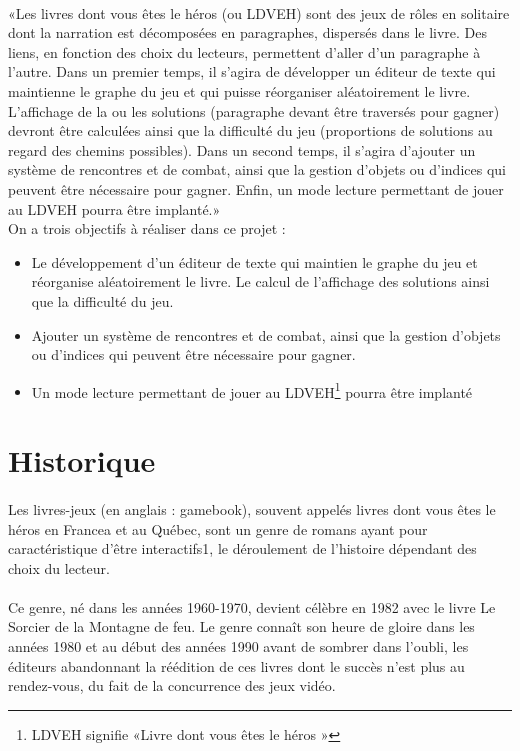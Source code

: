 \documentclass[12pt,a4paper]{article}
\begin{document}
\paragraph{}«Les livres dont vous êtes le héros (ou LDVEH) sont des jeux de rôles en solitaire dont la narration est décomposées en paragraphes, dispersés dans le livre. Des liens, en fonction des choix du lecteurs, permettent d’aller d’un paragraphe à l’autre. Dans un premier temps, il s’agira de développer un éditeur de texte qui maintienne le graphe du jeu et qui puisse réorganiser aléatoirement le livre. L’affichage de la ou les solutions (paragraphe devant être traversés pour gagner) devront être calculées ainsi que la difficulté du jeu (proportions de solutions au regard des chemins possibles). Dans un second temps, il s’agira d’ajouter un système de rencontres et de combat, ainsi que la gestion d’objets ou d’indices qui peuvent être nécessaire pour gagner. Enfin, un mode lecture permettant de jouer au LDVEH pourra être implanté.» \\
On a trois objectifs à réaliser dans ce projet :\\

\begin{itemize}
	\item Le développement d'un éditeur de texte qui maintien le graphe du jeu et réorganise aléatoirement le livre. Le calcul de l'affichage des solutions ainsi que la difficulté du jeu.
	\item Ajouter un système de rencontres et de combat, ainsi que la gestion d’objets ou d’indices qui peuvent être nécessaire pour gagner.
	\item Un mode lecture permettant de jouer au LDVEH\footnote{LDVEH signifie «Livre dont vous êtes le héros »} pourra être implanté
\end{itemize}
\section{Historique}
\paragraph{}Les livres-jeux (en anglais : gamebook), souvent appelés livres dont vous êtes le héros en Francea et au Québec, sont un genre de romans ayant pour caractéristique d'être interactifs1, le déroulement de l'histoire dépendant des choix du lecteur.
\paragraph{}Ce genre, né dans les années 1960-1970, devient célèbre en 1982 avec le livre Le Sorcier de la Montagne de feu. Le genre connaît son heure de gloire dans les années 1980 et au début des années 1990 avant de sombrer dans l'oubli, les éditeurs abandonnant la réédition de ces livres dont le succès n'est plus au rendez-vous, du fait de la concurrence des jeux vidéo.
\end{document}
